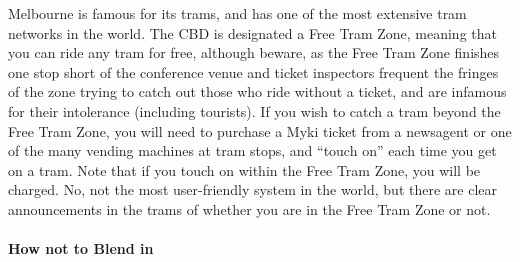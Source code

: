 Melbourne is famous for its trams, and has one of the most extensive
tram networks in the world. The CBD is designated a Free Tram Zone,
meaning that you can ride any tram for free, although beware, as the
Free Tram Zone finishes one stop short of the conference venue and 
ticket inspectors frequent the fringes of the zone trying to catch out
those who ride without a ticket, and are infamous for their intolerance
(including tourists). If you wish to catch a tram beyond the Free Tram
Zone, you will need to purchase a Myki ticket from a newsagent or one of
the many vending machines at tram stops, and ``touch on'' each time you
get on a tram. Note that if you touch on within the Free Tram Zone, you
will be charged. No, not the most user-friendly system in the world, but
there are clear announcements in the trams of whether you are in the
Free Tram Zone or not.




\paragraph{How not to Blend in}

